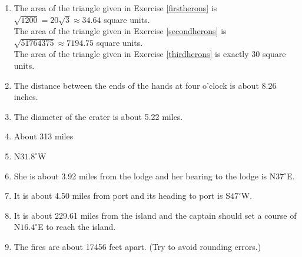\documentclass{ximera}
\begin{document}
\begin{enumerate}
\setcounter{enumi}{\value{HW}}
\item The area of the triangle given in Exercise \ref{firstherons} is $\sqrt{1200} = 20\sqrt{3} \approx 34.64$ square units.\\
The area of the triangle given in Exercise \ref{secondherons} is $\sqrt{51764375} \approx 7194.75$ square units.\\
The area of the triangle given in Exercise \ref{thirdherons} is exactly $30$ square units.

\item The distance between the ends of the hands at four o'clock is about $8.26$ inches.

\item  The diameter of the crater is about 5.22 miles.

\item About 313 miles

\item N$31.8^{\circ}$W

\item She is about 3.92 miles from the lodge and her bearing to the lodge is N$37^{\circ}$E. 

\item  It is about 4.50 miles from port and its heading to port is S$47^{\circ}$W.

\item  It is about 229.61 miles from the island and the captain should set a course of N$16.4^{\circ}$E to reach the island.

\item The fires are about 17456 feet apart. (Try to avoid rounding errors.)

\end{enumerate}
\end{document}
